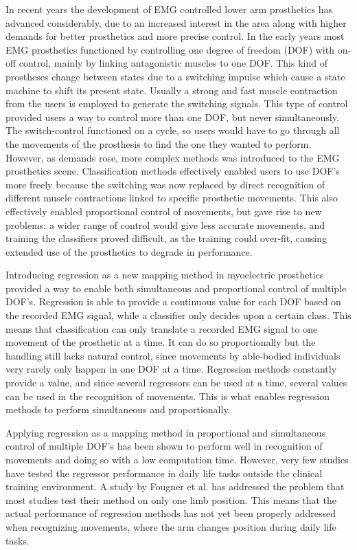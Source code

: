 \documentclass[a4paper, 10pt, conference]{ieeeconf}      %
\begin{document}
%		
In recent years the development of EMG controlled lower arm prosthetics has advanced considerably, due to an increased interest in the area along with higher demands for better prosthetics and more precise control. \cite{Fougner2012} In the early years most EMG prosthetics functioned by controlling one degree of freedom (DOF) with on-off control, mainly by linking antagonistic muscles to one DOF. This kind of prostheses change between states due to a switching impulse which cause a state machine to shift its present state. Usually a strong and fast muscle contraction from the users is employed to generate the switching signals. \cite{amsuess2014}
This type of control provided users a way to control more than one DOF, but never simultaneously. The switch-control functioned on a cycle, so users would have to go through all the movements of the prosthesis to find the one they wanted to perform. However, as demands rose, more complex methods was introduced to the EMG prosthetics scene. Classification methods effectively enabled users to use DOF's more freely because the switching was now replaced by direct recognition of different muscle contractions linked to specific prosthetic movements. This also effectively enabled proportional control of movements, but gave rise to new problems: a wider range of control would give less accurate movements, and training the classifiers proved difficult, as the training could over-fit, causing extended use of the prosthetics to degrade in performance. \cite{Ison2016}

Introducing regression as a new mapping method in myoelectric prosthetics provided a way to enable both simultaneous and proportional control of multiple DOF's. Regression is able to provide a continuous value for each DOF based on the recorded EMG signal, while a classifier only decides upon a certain class. \cite{hahne2014, jiang2010}
This means that classification can only translate a recorded EMG signal to one movement of the prosthetic at a time. It can do so proportionally but the handling still lacks natural control, since movements by able-bodied individuals very rarely only happen in one DOF at a time. Regression methods constantly provide a value, and since several regressors can be used at a time, several values can be used in the recognition of movements. This is what enables regression methods to perform simultaneous and proportionally. 

Applying regression as a mapping method in proportional and simultaneous control of multiple DOF's has been shown to perform well in recognition of movements and doing so with a low computation time. \cite{hahne2014} However, very few studies have tested the regressor performance in daily life tasks outside the clinical training environment. \cite{jiang2012} A study by Fougner et al. \cite{Fougner2011} has addressed the problem that most studies test their method on only one limb position. This means that the actual performance of regression methods has not yet been properly addressed when recognizing movements, where the arm changes position during daily life tasks. 
\end{document}
